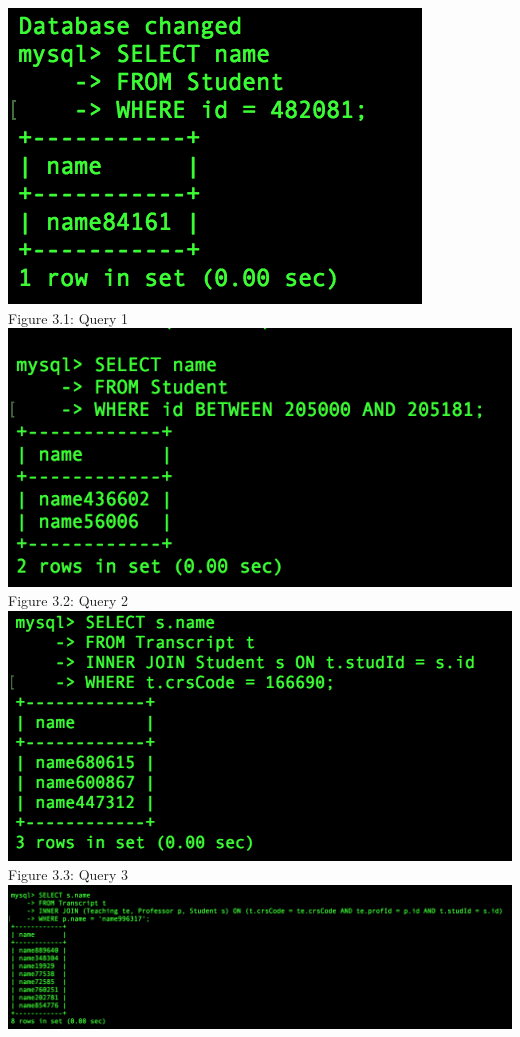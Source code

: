 \documentclass[11pt]{report}
\begin{document}
		\begin{center}
			\includegraphics[scale=0.8]{a1.PNG}\\
			Figure 3.1: Query 1\\
			\includegraphics[scale=0.53]{a2.PNG}\\
			Figure 3.2: Query 2\\
			\includegraphics[scale=0.55]{a3.PNG}\\
			Figure 3.3: Query 3\\
			\includegraphics[scale=0.48]{a4.PNG}\\

\end{center}
\end{document}
